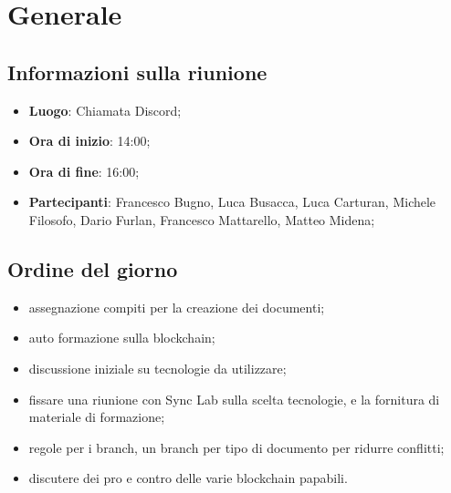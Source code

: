 \section{Generale}

\vspace{10pt}


\subsection{Informazioni sulla riunione}
\begin{itemize}
	\item \textbf{Luogo}: Chiamata Discord;
	\item \textbf{Ora di inizio}: 14:00;
	\item \textbf{Ora di fine}: 16:00;
	\item \textbf{Partecipanti}: Francesco Bugno, Luca Busacca, Luca Carturan, Michele Filosofo,
	Dario Furlan, Francesco Mattarello, Matteo Midena;
\end{itemize}

\vspace{5pt}

\subsection{Ordine del giorno}

\begin{itemize}
	\item assegnazione compiti per la creazione dei documenti;
	\item auto formazione sulla blockchain\glo;
	\item discussione iniziale su tecnologie da utilizzare;
	\item fissare una riunione con Sync Lab sulla scelta tecnologie, e la fornitura di materiale di formazione;
	\item regole per i branch, un branch per tipo di documento per ridurre conflitti;
	\item discutere dei pro e contro delle varie blockchain\glo{} papabili.
\end{itemize}

